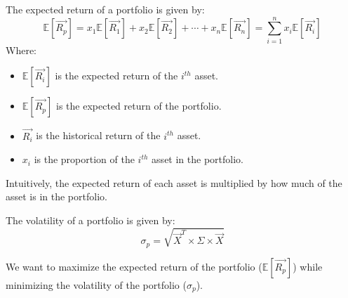 \begin{definition}
    The expected return of a portfolio is given by:
    \begin{equation}
        \mathbb{E}[\overrightarrow{R_p}] = x_1 \mathbb{E}[\overrightarrow{R_1}] + x_2 \mathbb{E}[\overrightarrow{R_2}] + \cdots + x_n \mathbb{E}[\overrightarrow{R_n}] = \sum_{i=1}^{n} x_i \mathbb{E}[\overrightarrow{R_i}]
    \end{equation}
    Where:
    \begin{itemize}
        \item $\mathbb{E}[\overrightarrow{R_i}]$ is the expected return of the $i^{th}$ asset.
        \item $\mathbb{E}[\overrightarrow{R_p}]$ is the expected return of the portfolio.
        \item $\overrightarrow{R_i}$ is the historical return of the $i^{th}$ asset.
        \item $x_i$ is the proportion of the $i^{th}$ asset in the portfolio.
    \end{itemize}
    Intuitively, the expected return of each asset is multiplied by how much of the asset is in the portfolio.
\end{definition}

\begin{definition}
    The volatility of a portfolio is given by:
    \begin{equation}
        \sigma_p = \sqrt{\overrightarrow{X}^T \times \Sigma \times \overrightarrow{X}}
    \end{equation}
\end{definition}

\begin{corollary}
    [Maximization]
    We want to maximize the expected return of the portfolio ($\mathbb{E}[\overrightarrow{R_p}]$) while minimizing the volatility of the portfolio ($\sigma_p$).\\
\end{corollary}

